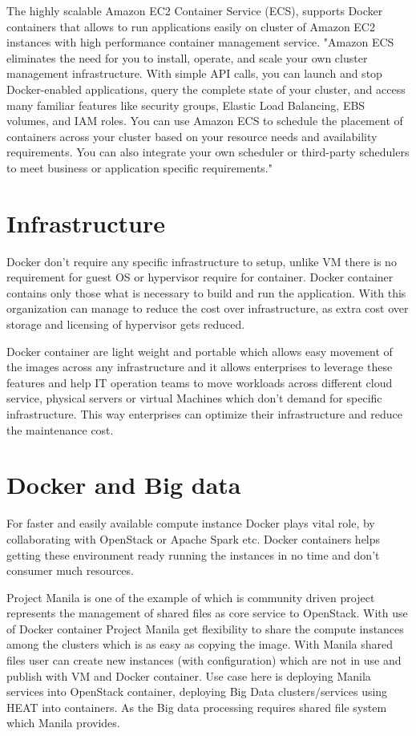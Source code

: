 \documentclass[9pt,twocolumn,twoside]{../../styles/osajnl}
\begin{document}
The highly scalable Amazon EC2 Container Service (ECS), supports Docker containers that allows to run applications easily on cluster of Amazon EC2 instances with high performance container management service. "Amazon ECS eliminates the need for you to install, operate, and scale your own cluster management infrastructure. With simple API calls, you can launch and stop Docker-enabled applications, query the complete state of your cluster, and access many familiar features like security groups, Elastic Load Balancing, EBS volumes, and IAM roles. You can use Amazon ECS to schedule the placement of containers across your cluster based on your resource needs and availability requirements. You can also integrate your own scheduler or third-party schedulers to meet business or application specific requirements."\cite{ECS} 

\section{Infrastructure}
Docker don't require any specific infrastructure to setup, unlike VM there is no requirement for guest OS or hypervisor require for container. Docker container contains only those what is necessary to build and run the application. With this organization can manage to reduce the cost over infrastructure, as extra cost over storage and licensing of hypervisor gets reduced.

Docker container are light weight and portable which allows easy movement of the images across any infrastructure and it allows enterprises to leverage these features and help IT operation teams to move workloads across different cloud service, physical servers or virtual Machines which don't demand for specific infrastructure. This way enterprises can optimize their infrastructure and reduce the maintenance cost.

\section{Docker and Big data}
For faster and easily available compute instance Docker plays vital role, by collaborating with OpenStack or Apache Spark etc. Docker containers helps getting these environment ready running the instances in no time and don't consumer much resources.

Project Manila is one of the example of which is community driven project represents the management of shared files as core service to OpenStack. With use of Docker container Project Manila get flexibility to share the compute instances among the clusters which is as easy as copying the image. With Manila shared files user can create new instances (with configuration) which are not in use and publish with VM and Docker container. Use case here is deploying Manila services into OpenStack container, deploying Big Data clusters/services using HEAT into containers. As the Big data processing requires shared file system which Manila provides.\cite{Manila}
\end{document}
